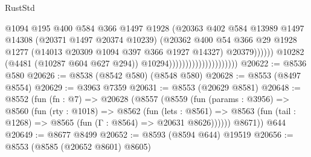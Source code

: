 \begin{lexlean}{RustStd}
\begin{coremodule}
                                                      @1094
                                                      @195
                                                      @400
                                                      @584
                                                      @366
                                                      @1497
                                                      @1928
                                                      (@20363
                                                        @402
                                                        @584
                                                        @13989
                                                        @1497
                                                        @14308
                                                        (@20371 @1497 @20374 @10239)
                                                        (@20362
                                                          @400
                                                          @54
                                                          @366
                                                          @29
                                                          @1928
                                                          @1277
                                                          (@14013
                                                            @20309
                                                            @1094
                                                            @397
                                                            @366
                                                            @1927
                                                            @14327)
                                                          @20379))))))
                                              @10282
                                              (@4481 (@10287 @604 @627 @294))
                                              @10294)))))))))))))))))))))
@20622 := @8536 @580
@20626 := @8538 (@8542 @580) (@8548 @580)
@20628 := @8553 (@8497 @8554)
@20629 := @3963 @7359
@20631 := @8553 (@20629 @8581)
@20648 := @8552
    (fun (fn : @7) =>
    @20628
      (@8557
        (@8559
          (fun (params : @3956) =>
          @8560
            (fun (rty : @1018) =>
            @8562
              (fun (lets : @8561) =>
              @8563 (fun (tail : @1268) => @8565 (fun (Γ : @8564) => @20631 @8626))))))
        @8671))
    @644
@20649 := @8677 @8499
@20652 := @8593 (@8594 @644) @19519
@20656 := @8553 (@8585 (@20652 @8601) @8605)

\end{coremodule}
\end{lexlean}

